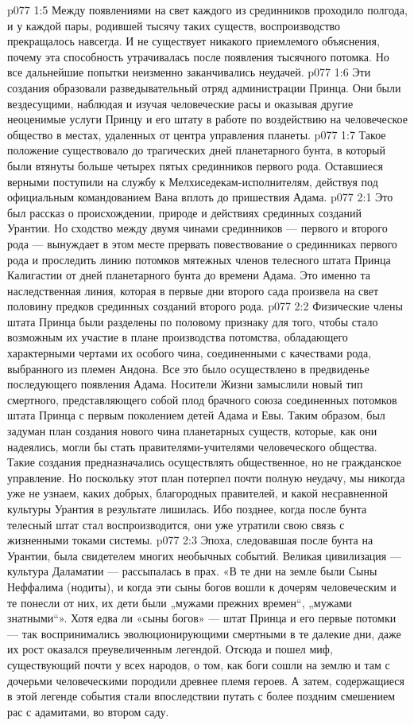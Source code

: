 \vs p077 1:5 Между появлениями на свет каждого из срединников проходило полгода, и у каждой пары, родившей тысячу таких существ, воспроизводство прекращалось навсегда. И не существует никакого приемлемого объяснения, почему эта способность утрачивалась после появления тысячного потомка. Но все дальнейшие попытки неизменно заканчивались неудачей.
\vs p077 1:6 \pc Эти создания образовали разведывательный отряд администрации Принца. Они были вездесущими, наблюдая и изучая человеческие расы и оказывая другие неоценимые услуги Принцу и его штату в работе по воздействию на человеческое общество в местах, удаленных от центра управления планеты.
\vs p077 1:7 Такое положение существовало до трагических дней планетарного бунта, в который были втянуты больше четырех пятых срединников первого рода. Оставшиеся верными поступили на службу к Мелхиседекам\hyp{}исполнителям, действуя под официальным командованием Вана вплоть до пришествия Адама.
\vs p077 2:1 Это был рассказ о происхождении, природе и действиях срединных созданий Урантии. Но сходство между двумя чинами срединников --- первого и второго рода --- вынуждает в этом месте прервать повествование о срединниках первого рода и проследить линию потомков мятежных членов телесного штата Принца Калигастии от дней планетарного бунта до времени Адама. Это именно та наследственная линия, которая в первые дни второго сада произвела на свет половину предков срединных созданий второго рода.
\vs p077 2:2 \pc Физические члены штата Принца были разделены по половому признаку для того, чтобы стало возможным их участие в плане производства потомства, обладающего характерными чертами их особого чина, соединенными с качествами рода, выбранного из племен Андона. Все это было осуществлено в предвиденье последующего появления Адама. Носители Жизни замыслили новый тип смертного, представляющего собой плод брачного союза соединенных потомков штата Принца с первым поколением детей Адама и Евы. Таким образом, был задуман план создания нового чина планетарных существ, которые, как они надеялись, могли бы стать правителями\hyp{}учителями человеческого общества. Такие создания предназначались осуществлять общественное, но не гражданское управление. Но поскольку этот план потерпел почти полную неудачу, мы никогда уже не узнаем, каких добрых, благородных правителей, и какой несравненной культуры Урантия в результате лишилась. Ибо позднее, когда после бунта телесный штат стал воспроизводится, они уже утратили свою связь с жизненными токами системы.
\vs p077 2:3 Эпоха, следовавшая после бунта на Урантии, была свидетелем многих необычных событий. Великая цивилизация --- культура Даламатии --- рассыпалась в прах. «В те дни на земле были Сыны Неффалима (нодиты), и когда эти сыны богов вошли к дочерям человеческим и те понесли от них, их дети были „мужами прежних времен“, „мужами знатными“». Хотя едва ли «сыны богов» --- штат Принца и его первые потомки --- так воспринимались эволюционирующими смертными в те далекие дни, даже их рост оказался преувеличенным легендой. Отсюда и пошел миф, существующий почти у всех народов, о том, как боги сошли на землю и там с дочерьми человеческими породили древнее племя героев. А затем, содержащиеся в этой легенде события стали впоследствии путать с более поздним смешением рас с адамитами, во втором саду.
